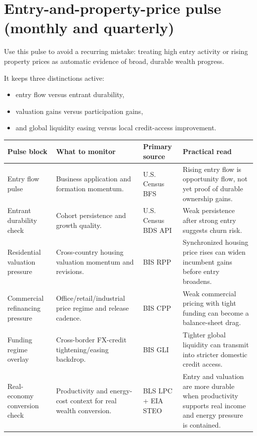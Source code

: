 \documentclass[11pt,openany]{book}
\begin{document}
\section{Entry-and-property-price pulse (monthly and quarterly)}

Use this pulse to avoid a recurring mistake: treating high entry activity or rising property prices as automatic evidence of broad, durable wealth progress.

It keeps three distinctions active:
\begin{itemize}
  \item entry flow versus entrant durability,
  \item valuation gains versus participation gains,
  \item and global liquidity easing versus local credit-access improvement.
\end{itemize}

\begin{center}
\small
\begin{tabularx}{\textwidth}{>{\raggedright\arraybackslash}p{}>{\raggedright\arraybackslash}p{}>{\raggedright\arraybackslash}p{}X}
\toprule
\textbf{Pulse block} & \textbf{What to monitor} & \textbf{Primary source} & \textbf{Practical read} \\
\midrule
Entry flow pulse & Business application and formation momentum. & U.S. Census BFS & Rising entry flow is opportunity flow, not yet proof of durable ownership gains. \\
Entrant durability check & Cohort persistence and growth quality. & U.S. Census BDS API & Weak persistence after strong entry suggests churn risk. \\
Residential valuation pressure & Cross-country housing valuation momentum and revisions. & BIS RPP & Synchronized housing price rises can widen incumbent gains before entry broadens. \\
Commercial refinancing pressure & Office/retail/industrial price regime and release cadence. & BIS CPP & Weak commercial pricing with tight funding can become a balance-sheet drag. \\
Funding regime overlay & Cross-border FX-credit tightening/easing backdrop. & BIS GLI & Tighter global liquidity can transmit into stricter domestic credit access. \\
Real-economy conversion check & Productivity and energy-cost context for real wealth conversion. & BLS LPC + EIA STEO & Entry and valuation are more durable when productivity supports real income and energy pressure is contained. \\
\bottomrule
\end{tabularx}
\normalsize
\end{center}
\end{document}
